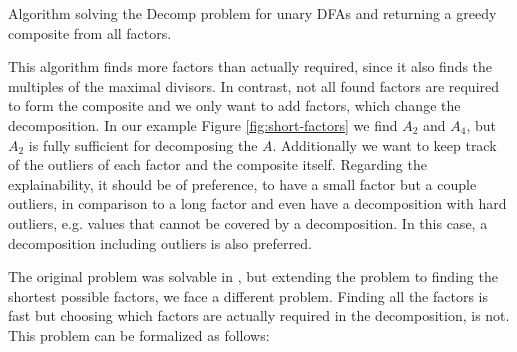 \begin{algorithm}[H]
	\label{algo:composite}
	\DontPrintSemicolon
	
	
	
	
	\caption{Algorithm solving the Decomp problem for unary DFAs and returning a greedy composite from all factors.}
\end{algorithm}

This algorithm finds more factors than actually required, since it also finds the multiples of the maximal divisors. In contrast, not all found factors are required to form the composite and we only want to add factors, which change the decomposition. In our example Figure \ref{fig:short-factors} we find $A_2$ and $A_4$, but $A_2$ is fully sufficient for decomposing the \DFA $A$. Additionally we want to keep track of the outliers of each factor and the composite itself. Regarding the explainability, it should be of preference, to have a small factor but a couple outliers, in comparison to a long factor and even have a decomposition with hard outliers, e.g. values that cannot be covered by a decomposition. In this case, a decomposition including outliers is also preferred.

The original problem was solvable in \LogSpace, but extending the problem to finding the shortest possible factors, we face a different problem. Finding all the factors is fast but choosing which factors are actually required in the decomposition, is not. This problem can be formalized as follows:

